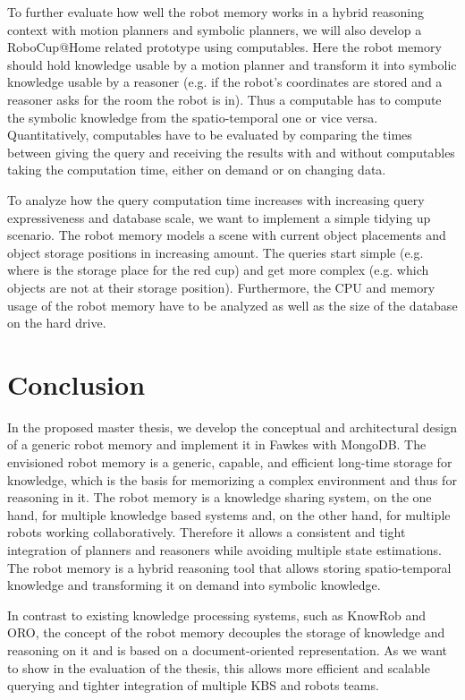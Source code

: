 To further evaluate how well the robot memory works in a hybrid
reasoning context with motion planners and symbolic planners, we will
also develop a RoboCup@Home related prototype using computables. Here
the robot memory should hold knowledge usable by a motion planner and
transform it into symbolic knowledge usable by a reasoner (e.g. if the
robot's coordinates are stored and a reasoner asks for the room the
robot is in). Thus a computable has to compute the symbolic knowledge
from the spatio-temporal one or vice versa. Quantitatively,
computables have to be evaluated by comparing the times between giving
the query and receiving the results with and without computables
taking the computation time, either on demand or on changing data.

To analyze how the query computation time increases with increasing query
expressiveness and database scale, we want to implement a simple
tidying up scenario. The robot memory models a scene with current
object placements and object storage positions in increasing
amount. The queries start simple (e.g. where is the storage place for
the red cup) and get more complex (e.g. which objects are not at their
storage position). Furthermore, the CPU and memory usage of the robot
memory have to be analyzed as well as the size of the database on the
hard drive.

\chapter{Conclusion}
\label{sec:conclusion}
In the proposed master thesis, we develop the conceptual and
architectural design of a generic robot memory and implement it in
Fawkes with MongoDB. The envisioned robot memory is a generic,
capable, and efficient long-time storage for knowledge, which is the
basis for memorizing a complex environment and thus for reasoning in
it. The robot memory is a knowledge sharing system, on the one hand,
for multiple knowledge based systems and, on the other hand, for
multiple robots working collaboratively. Therefore it allows a
consistent and tight integration of planners and reasoners while
avoiding multiple state estimations. The robot memory is a hybrid
reasoning tool that allows storing spatio-temporal knowledge and
transforming it on demand into symbolic knowledge.

In contrast to existing knowledge processing systems, such as KnowRob
and ORO, the concept of the robot memory decouples the storage of
knowledge and reasoning on it and is based on a document-oriented
representation. As we want to show in the evaluation of the thesis,
this allows more efficient and scalable querying and tighter
integration of multiple KBS and robots teams.

